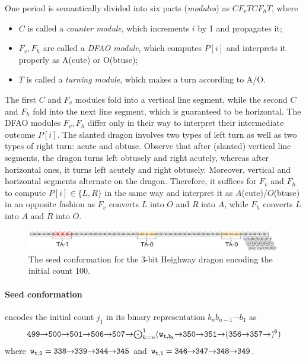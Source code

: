 \documentclass[runningheads]{llncs}
\newcommand{\east}{{\ensuremath \to}}
\newcommand{\se}{{\ensuremath \searrow}}
\begin{document}
One period is semantically divided into six parts (\textit{modules}) as $C F_v T C F_h T$, where %
\begin{itemize}
\item $C$ is called a \textit{counter module}, which increments $i$ by 1 and propagates it; 
\item $F_v, F_h$ are called a \textit{DFAO module}, which computes $P[i]$ and interprets it properly as A(cute) or O(btuse); 
\item $T$ is called a \textit{turning module}, which makes a turn according to A/O. 
\end{itemize}
The first $C$ and $F_v$ modules fold into a vertical line segment, while the second $C$ and $F_h$ fold into the next line segment, which is guaranteed to be horizontal. 
The DFAO modules $F_v, F_h$ differ only in their way to interpret their intermediate outcome $P[i]$. 
The slanted dragon involves two types of left turn as well as two types of right turn: acute and obtuse. 
Observe that after (slanted) vertical line segments, the dragon turns left obtusely and right acutely, whereas after horizontal ones, it turns left acutely and right obtusely. 
Moreover, vertical and horizontal segments alternate on the dragon. 
Therefore, it suffices for $F_v$ and $F_h$ to compute $P[i] \in \{L, R\}$ in the same way and interpret it as $A$(cute)/$O$(btuse) in an opposite fashion as $F_v$ converts $L$ into $O$ and $R$ into $A$, while $F_h$ converts $L$ into $A$ and $R$ into $O$. 

\begin{figure}[tb]
\includegraphics[width=\linewidth]{Figs/seed_sample2.png}
\caption{The seed conformation for the 3-bit Heighway dragon encoding the initial count 100.}
\label{fig:seed}
\end{figure}

\paragraph{Seed conformation} encodes the initial count $j_1$ in its binary representation $b_n b_{n-1} \cdots b_1$ as
\begin{equation}\label{eq:turner_output}
	{\tt 499 \east 500 \east 501 \east 506 \east 507 \east \mbox{$\bigodot_{k = n}^1$} (w_{t, b_k} \east 350 \east 351 \east (356 \east 357 \east)^6)} 
\end{equation}
where ${\tt w_{t, 0} = 338 \east 339 \east 344 \east 345}$ and ${\tt w_{t, 1} = 346 \east 347 \east 348 \east 349}$. 
\end{document}
